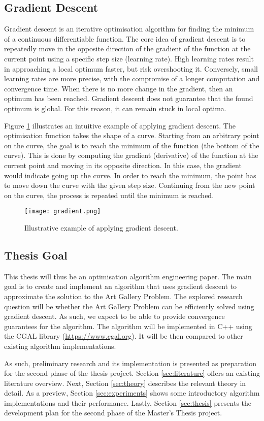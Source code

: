 \newpage
\subsection{Gradient Descent}

Gradient descent is an iterative optimisation algorithm for finding the minimum of a continuous differentiable function. The core idea of gradient descent is to repeatedly move in the opposite direction of the gradient of the function at the current point using a specific step size (learning rate). High learning rates result in approaching a local optimum faster, but risk overshooting it. Conversely, small learning rates are more precise, with the compromise of a longer computation and convergence time.
When there is no more change in the gradient, then an optimum has been reached. Gradient descent does not guarantee that the found optimum is global. For this reason, it can remain stuck in local optima.

Figure \ref{fig:gradient_descent} illustrates an intuitive example of applying gradient descent. The optimisation function takes the shape of a curve. Starting from an arbitrary point on the curve, the goal is to reach the minimum of the function (the bottom of the curve). This is done by computing the gradient (derivative) of the function at the current point and moving in its opposite direction. In this case, the gradient would indicate going up the curve. In order to reach the minimum, the point has to move down the curve with the given step size. Continuing from the new point on the curve, the process is repeated until the minimum is reached.

\begin{figure}[h!]
    \centering
    \texttt{[image: gradient.png]}
    \caption{Illustrative example of applying gradient descent.}
    \label{fig:gradient_descent}
\end{figure}

\subsection{Thesis Goal}

This thesis will thus be an optimisation algorithm engineering paper. The main goal is to create and implement an algorithm that uses gradient descent to approximate the solution to the Art Gallery Problem. The explored research question will be whether the Art Gallery Problem can be efficiently solved using gradient descent. As such, we expect to be able to provide convergence guarantees for the algorithm. The algorithm will be implemented in C++ using the CGAL library (\url{https://www.cgal.org}). It will be then compared to other existing algorithm implementations.

As such, preliminary research and its implementation is presented as preparation for the second phase of the thesis project. Section \ref{sec:literature} offers an existing literature overview. Next, Section \ref{sec:theory} describes the relevant theory in detail.
As a preview, Section \ref{sec:experiments} shows some introductory algorithm implementations and their performance.
Lastly, Section \ref{sec:thesis} presents the development plan for the second phase of the Master's Thesis project.